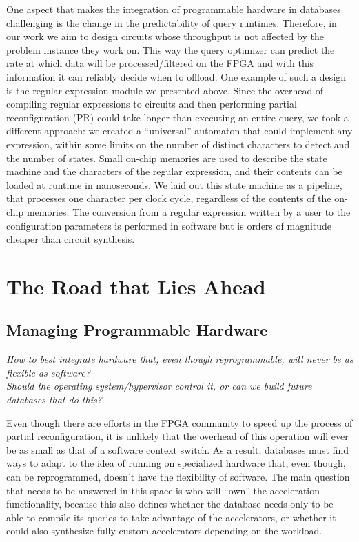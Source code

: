 \documentclass[11pt]{article}
\begin{document}
One aspect that makes the integration of programmable hardware in databases challenging is the change in the predictability of query runtimes. Therefore, in our work we aim to design circuits whose throughput is not affected by the problem instance they work on. This way the query optimizer can predict the rate at which data will be processed/filtered on the FPGA and with this information it can reliably decide when to offload. One example of such a design is the regular expression module we presented above. Since the overhead of compiling regular expressions to circuits and then performing partial reconfiguration (PR) could take longer than executing an entire query, we took a different approach: we created a ``universal'' automaton that could implement any expression, within some limits on the number of distinct characters to detect and the number of states. Small on-chip memories are used to describe the state machine and the characters of the regular expression, and their contents can be loaded at runtime in nanoseconds. We laid out this state machine as a pipeline, that processes one character per clock cycle, regardless of the contents of the on-chip memories. The conversion from a regular expression written by a user to the configuration parameters is performed in software but is orders of magnitude cheaper than circuit synthesis.


\section{The Road that Lies Ahead}

\subsection{Managing Programmable Hardware}

\emph{How to best integrate hardware that, even though reprogrammable, will never be as flexible as software?}\\
\emph{Should the operating system/hypervisor control it, or can we build future databases that do this?}
\smallskip

Even though there are efforts in the FPGA community to speed up the process of partial reconfiguration, it is unlikely that the overhead of this operation will ever be as small as that of a software context switch. As a result, databases must find ways to adapt to the idea of running on specialized hardware that, even though, can be reprogrammed, doesn't have the flexibility of software. The main question that needs to be answered in this space is who will ``own'' the acceleration functionality, because this also defines whether the database needs only to be able to compile its queries to take advantage of the accelerators, or whether it could also synthesize fully custom accelerators depending on the workload.
\end{document}

